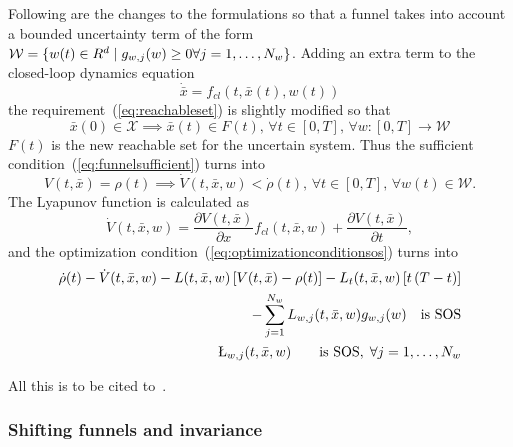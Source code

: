 Following are the changes to the formulations so that a funnel takes into
account a bounded uncertainty term of the form \(\mathcal{W} = \lbrace w(t) \in
  R^d \mid g_{w,j}(w) \geq 0 \forall j = 1,\ldots,N_w\rbrace\). Adding an extra term
to the closed-loop dynamics equation
\[
  \dot{\bar{x}} = f_{cl}(t, \bar{x}(t), w(t))
\]
the requirement~(\ref{eq:reachableset}) is slightly modified so that
\begin{equation}
  \label{eq:uncertain-reachableset}
  \bar{x}(0) \in \mathcal{X} \implies \bar{x}(t) \in F(t),\, \forall t \in
  [0,T], \, \forall w \colon [0,T] \rightarrow \mathcal{W}
\end{equation} 
\(F(t)\) is the new reachable set for the uncertain system. Thus the sufficient
condition~(\ref{eq:funnelsufficient}) turns into
\begin{equation}
  \label{eq:funneluncertain-sufficient}
  V(t,\bar{x}) = \rho(t) \implies \dot{V}(t,\bar{x},w) < \dot{\rho}(t), \, \forall t \in [0,T], \, \forall w(t) \in \mathcal{W}.
\end{equation}
The Lyapunov function is calculated as
\begin{equation}
  \dot{V}(t,\bar{x}, w) = \frac{\partial V(t,\bar{x})}{\partial x} f_{cl}(t,\bar{x},w) + \frac{\partial V(t,\bar{x})}{\partial t},
\end{equation}
and the optimization condition~(\ref{eq:optimizationconditionsos}) turns into
\begin{align}
  \label{eq:optimizationconditionuncertain}
  \dot{\rho}(t) - \dot{V}(t,\bar{x},w) - L(t,\bar{x},w) \left[ V(t,\bar{x}) - \rho(t) \right] - L_{t}(t,\bar{x},w)\left[ t\left( T - t \right) \right]  & \nonumber \\
  - \sum_{j=1}^{N_{w}} L_{w,j}(t,\bar{x},w)g_{w,j}(w) \quad \text{is SOS} &  \\
  \L_{w,j}(t,\bar{x},w) \qquad \text{is SOS}, \; \forall j = 1,\ldots,N_w \nonumber
\end{align}

All this is to be cited to~\cite{majumdarFunnelLibrariesRealtime2017}.

\subsubsection{Shifting funnels and invariance}

